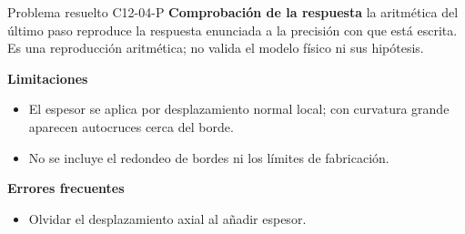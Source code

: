 \documentclass[10pt,openany]{book}
\begin{document}
\begin{studiumworked}{Problema resuelto C12-04-P}
\noindent\textbf{Comprobación de la respuesta} la aritmética del último paso reproduce la respuesta enunciada a la precisión con que está escrita. Es una reproducción aritmética; no valida el modelo físico ni sus hipótesis.

\noindent\textbf{Limitaciones}
\begin{itemize}
\item El espesor se aplica por desplazamiento normal local; con curvatura grande aparecen autocruces cerca del borde.
\item No se incluye el redondeo de bordes ni los límites de fabricación.
\end{itemize}

\noindent\textbf{Errores frecuentes}
\begin{itemize}
\item Olvidar el desplazamiento axial al añadir espesor.
\end{itemize}
\end{studiumworked}
\end{document}

